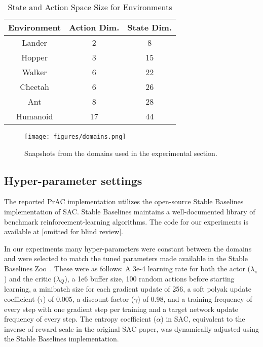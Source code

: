 \documentclass[letterpaper]{article} %
\begin{document}
\begin{center}
\begin{table}
\centering
\caption{State and Action Space Size for Environments}
\begin{tabular}{ | c c c | }
 \hline
Environment & Action Dim. & State Dim. \\
 \hline
 Lander & 2 & 8 \\ 
 Hopper & 3 & 15 \\  
 Walker & 6 & 22 \\    
 Cheetah & 6 & 26 \\  
 Ant & 8 & 28 \\  
 Humanoid & 17 & 44 \\
 \hline
\end{tabular}
\label{table:state-action-dim}
\end{table}
\end{center}


\begin{figure}
    \texttt{[image: figures/domains.png]}
    \caption{Snapshots from the domains used in the experimental section.}
    \label{domains}
\end{figure}

\subsection{Hyper-parameter settings}

The reported PrAC implementation utilizes the open-source Stable Baselines~\cite{stable-baselines} implementation of SAC. Stable Baselines maintains a well-documented library of benchmark reinforcement-learning algorithms. The code for our experiments is available at [omitted for blind review].

In our experiments many hyper-parameters were constant between the domains and were selected to match the tuned parameters made available in the Stable Baselines Zoo~\cite{rl-zoo3}. These were as follows: A 3e-4 learning rate for both the actor ($\lambda_\pi$) and the critic ($\lambda_Q$), a 1e6 buffer size, 100 random actions before starting learning, a minibatch size for each gradient update of 256, a soft polyak update coefficient ($\tau$) of 0.005, a discount factor ($\gamma$) of 0.98, and a training frequency of every step with one gradient step per training and a target network update frequency of every step.
The entropy coefficient ($\alpha$) in SAC, equivalent to the inverse of reward scale in the original SAC paper, was dynamically adjusted using the Stable Baselines implementation.
\end{document}
